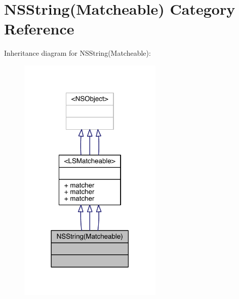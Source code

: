 \hypertarget{category_n_s_string_07_matcheable_08}{\section{N\-S\-String(Matcheable) Category Reference}
\label{category_n_s_string_07_matcheable_08}
}


Inheritance diagram for N\-S\-String(Matcheable)\-:\nopagebreak
\begin{figure}[H]
\begin{center}
\leavevmode
\includegraphics[width=194pt]{category_n_s_string_07_matcheable_08__inherit__graph}
\end{center}
\end{figure}


